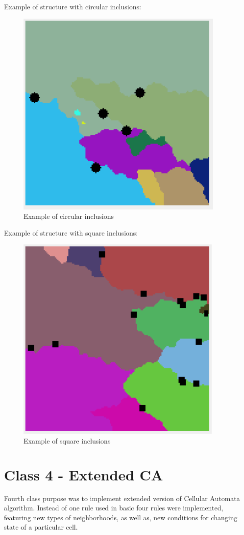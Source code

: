 \documentclass[a4paper, 11pt]{article}
\begin{document}
Example of structure with circular inclusions:
\begin{figure}[H]
\centering
  \includegraphics[]{CircularInclusionsExample}
  \caption{Example of circular inclusions}
  \label{fig:boat1}
\end{figure}

Example of structure with square inclusions:
\begin{figure}[H]
\centering
  \includegraphics[]{SquareInclusionsExample}
  \caption{Example of square inclusions}
  \label{fig:boat1}
\end{figure}
\section*{Class 4 - Extended CA}
Fourth class purpose was to implement extended version of Cellular Automata algorithm. Instead of one rule used in basic four rules were implemented, featuring new types of neighborhoods, as well as, new conditions for changing state of a particular cell.
\end{document}
